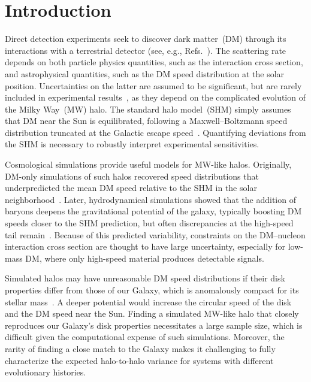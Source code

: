 \documentclass[aps,prl,reprint,superscriptaddress,nopreprintnumbers,nobibnotes,floatfix,longbibliography,footinbib]{revtex4-2}
\begin{document}
\section{Introduction}
\label{sec:1}
\nopagebreak 
Direct detection experiments seek to discover dark matter~(DM) through its interactions with a terrestrial detector (see, e.g., Refs.~\cite{Cerdeno10,Lin22,Yu25}). The scattering rate depends on both particle physics quantities, such as the interaction cross section, and astrophysical quantities, such as the DM speed distribution at the solar position. Uncertainties on the latter are assumed to be significant, but are rarely included in experimental results~\cite{McCabe10,Baxter21,Aalbers23a}, as they depend on the complicated evolution of the Milky Way~(MW) halo. The standard halo model~(SHM) simply assumes that DM near the Sun is equilibrated, following a Maxwell--Boltzmann speed distribution truncated at the Galactic escape speed~\citep{Wasserman86,Drukier86,Freese88}. Quantifying deviations from the SHM is necessary to robustly interpret experimental sensitivities. 

Cosmological simulations provide useful models for MW-like halos. Originally, DM-only simulations of such halos recovered speed distributions that underpredicted the mean DM speed relative to the SHM in the solar neighborhood~\cite{Wojtak05,Hansen06,Vogelsberger08,Vogelsberger09,Kuhlen10,Green10,Vogelsberger13,Bozorgnia17}. Later, hydrodynamical simulations showed that the addition of baryons deepens the gravitational potential of the galaxy, typically boosting DM speeds closer to the SHM prediction, but often discrepancies at the high-speed tail remain~\citep{Ling10,Tissera10,Pillepich14,Butsky16,Kelso16,Sloane16,Bozorgnia16,Bozorgnia17, Poole-McKenzie20, Bozorgnia20,Hryczuk20, Nunez-Castineyra23,Lawrence23,Staudt24}. Because of this predicted variability, constraints on the DM--nucleon interaction cross section are thought to have large uncertainty, especially for low-mass DM, where only high-speed material produces detectable signals. 

Simulated halos may have unreasonable DM speed distributions if their disk properties differ from those of our Galaxy, which is anomalously compact for its stellar mass~\citep{Hammer07,Licquia16a,Boardman20,Tsukui25}. A deeper potential would increase the circular speed of the disk and the DM speed near the Sun. Finding a simulated MW-like halo that closely reproduces our Galaxy's disk properties necessitates a large sample size, which is difficult given the computational expense of such simulations. Moreover, the rarity of finding a close match to the Galaxy makes it challenging to fully characterize the expected halo-to-halo variance for systems with different evolutionary histories.
\end{document}
